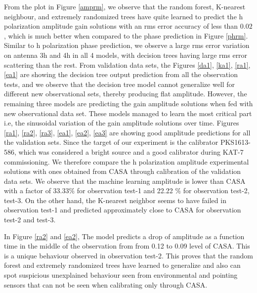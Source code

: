 From the plot in Figure \ref{amprm}, we observe that the random forest, K-nearest neighbour, and extremely randomized trees have quite learned to predict the h polarization amplitude gain solutions with an rms error accuracy of less than $0.02$, which is much better when compared to the phase prediction in Figure \ref{phrm}. Similar to h polarization phase prediction, we observe a large rms error variation on antenna 3h and 4h in all 4 models, with decision trees having large rms error scattering than the rest. From validation data sets, the Figures \ref{da1}, \ref{ka1}, \ref{ra1}, \ref{ea1} are showing the decision tree output prediction from all the observation tests, and we observe that the decision tree model cannot generalize well for different new observational sets, thereby producing flat amplitude. However, the remaining three models are predicting the gain amplitude solutions when fed with new observational data set. These models managed to learn the most critical part i.e, the sinusoidal variation of the gain amplitude solutions over time. Figures \ref{ra1}, \ref{ra2}, \ref{ra3}, \ref{ea1}, \ref{ea2}, \ref{ea3} are showing good amplitude predictions for all the validation sets. Since the target of our experiment is the calibrator PKS1613-586, which was considered a bright source and a good calibrator during KAT-7 commissioning. We therefore compare the h polarization amplitude experimental solutions with ones obtained from CASA through calibration of the validation data sets. We observe that the machine learning amplitude is lower than CASA with a factor of 33.33$\%$ for observation test-1 and 22.22 $\%$ for observation test-2, test-3. On the other hand, the K-nearest neighbor seems to have failed in observation test-1 and predicted approximately close to CASA for observation test-2 and test-3.

In Figure \ref{ra2} and \ref{ea2}, The model predicts a drop  of amplitude as a function time in the middle of the observation from from 0.12 to 0.09 level of CASA. This is a unique behaviour observed in observation test-2. This proves that the random forest and extremely randomized trees have learned to generalize and also can spot suspicious unexplained behaviour seen from environmental and pointing sensors that can not be seen when calibrating only through CASA.  
